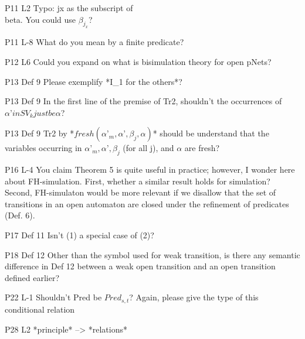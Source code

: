 \documentclass{article}
\begin{document}
P11 L2 Typo: jx as the subscript of \\beta. You could use $\beta_{j_x}$?

P11 L-8 What do you mean by a finite predicate?

P12 L6 Could you expand on what is bisimulation theory for open pNets?

P13 Def 9 Please exemplify *I\_1 for the others*?

P13 Def 9 In the first line of the premise of Tr2, shouldn’t the occurrences of $\alpha’ in SV_k just be \alpha$?

P13 Def 9 Tr2 by *$fresh(\alpha’_m,\alpha’,\beta_j,\alpha)$* should be understand that the variables occurring in $\alpha’_m,\alpha’, \beta_j$ (for all j), and $\alpha$ are fresh?

P16 L-4 You claim Theorem 5 is quite useful in practice; however, I wonder here about FH-simulation. First, whether a similar result holds for simulation? Second, FH-simulaton would be more relevant if we 
disallow that the set of transitions in an open automaton are closed under the refinement of predicates (Def. 6).

P17 Def 11 Isn’t (1) a special case of (2)?

P18 Def 12 Other than the symbol used for weak transition, is there any semantic difference in Def 12 between a weak open transition and an open transition defined earlier?

P22 L-1 Shouldn’t Pred be $Pred_{s,t}$? Again, please give the type of this conditional relation

P28 L2 *principle* --> *relations*
\end{document}
